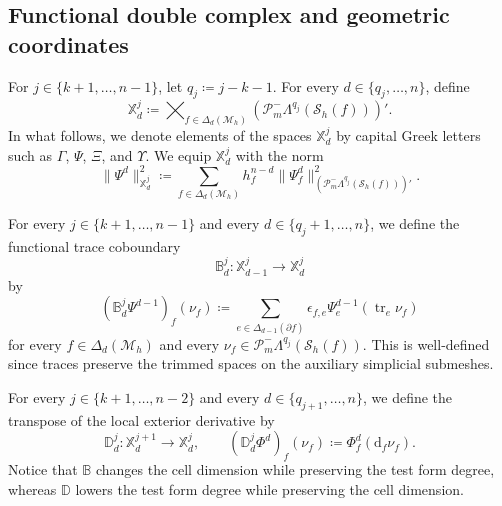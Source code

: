 \documentclass[a4paper,11pt]{article}
\theoremstyle{definition}
\newcommand{\DIFF}{\mathrm{d}}
\newcommand{\Mh}{\mathcal{M}_h}
\newcommand{\Sh}{\mathcal{S}_h}
\newcommand{\FM}[1]{\Delta_{#1}}
\newcommand{\PLtrim}[2]{\mathcal{P}_{#1}^{-}\Lambda^{#2}}
\newcommand{\trc}{\operatorname{tr}}
\begin{document}
\subsection{Functional double complex and geometric coordinates}
\label{subsubsec:functional.coordinates}
For $j\in\{k+1,\ldots,n-1\}$, let $q_j\coloneqq j-k-1$.
For every $d\in\{q_j,\ldots,n\}$, define
\[
\mathbb X_d^j
\coloneqq
\bigtimes_{f\in\FM{d}(\Mh)}
(\PLtrim{m}{q_j}(\Sh(f)))'.
\]
In what follows, we denote elements of the spaces $\mathbb X_d^j$ by capital Greek letters such as $\Gamma$, $\Psi$, $\Xi$, and $\Upsilon$.
We equip $\mathbb X_d^j$ with the norm
\[
\|\Psi^d\|_{\mathbb X_d^j}^2
\coloneqq
\sum_{f\in\FM{d}(\Mh)}
h_f^{n-d}\|\Psi_f^d\|_{(\PLtrim{m}{q_j}(\Sh(f)))'}^2.
\]

For every $j\in\{k+1,\ldots,n-1\}$ and every $d\in\{q_j+1,\ldots,n\}$, we define the functional trace coboundary
\[
\mathbb B_d^j\colon
\mathbb X_{d-1}^j
\longrightarrow
\mathbb X_d^j
\]
by
\[
\left(\mathbb B_d^j\Psi^{d-1}\right)_f(\nu_f)
\coloneqq
\sum_{e\in\FM{d-1}(\partial f)}
\epsilon_{f,e}
\Psi_e^{d-1}\left(\trc_e\nu_f\right)
\]
for every $f\in\FM{d}(\Mh)$ and every $\nu_f\in\PLtrim{m}{q_j}(\Sh(f))$.
This is well-defined since traces preserve the trimmed spaces on the auxiliary simplicial submeshes.

For every $j\in\{k+1,\ldots,n-2\}$ and every $d\in\{q_{j+1},\ldots,n\}$, we define the transpose of the local exterior derivative by
\[
  \mathbb D_d^j\colon
  \mathbb X_d^{j+1}
  \longrightarrow
  \mathbb X_d^j,
  \qquad
  (\mathbb D_d^j\Phi^d)_f(\nu_f)
  \coloneqq
  \Phi_f^d(\DIFF_f\nu_f).
\]
Notice that $\mathbb B$ changes the cell dimension while preserving the test form degree, whereas $\mathbb D$ lowers the test form degree while preserving the cell dimension.
\end{document}
